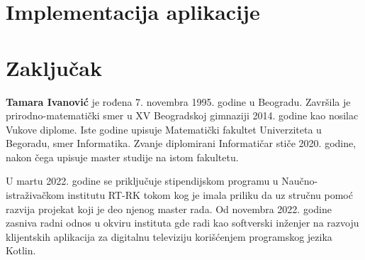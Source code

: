 \documentclass[12pt,oneside]{memoir}
\begin{document}
\chapter{Implementacija aplikacije}
\label{sec:implementacija}


\chapter{Zaključak}


\literatura

\backmatter

\begin{biografija}
  \textbf{Tamara Ivanović} je rođena 7. novembra 1995. godine u Beogradu. Završila je prirodno-matematički smer u XV Beogradskoj gimnaziji 2014. godine kao nosilac Vukove diplome. Iste godine upisuje Matematički fakultet Univerziteta u Begoradu, smer Informatika. Zvanje diplomirani Informatičar stiče 2020. godine, nakon čega upisuje master studije na istom fakultetu. 
  
  U martu 2022. godine se priključuje stipendijskom programu u Naučno-istraživačkom institutu RT-RK tokom kog je imala priliku da uz stručnu pomoć razvija projekat koji je deo njenog master rada. Od novembra 2022. godine zasniva radni odnos u okviru instituta gde radi kao softverski inženjer na razvoju klijentskih aplikacija za digitalnu televiziju korišćenjem programskog jezika Kotlin. 
\end{biografija}
\end{document}
